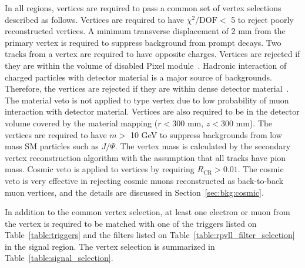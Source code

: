 In all regions, vertices are required to pass a common set of vertex selections described as follows. Vertices are required to have $\chi^2 / \mathrm{ DOF} <$ 5 to reject poorly reconstructed vertices. A minimum transverse displacement of 2 mm from the primary vertex is required to suppress background from prompt decays. Two tracks from a vertex are required to have opposite charges. Vertices are rejected if they are within the volume of disabled Pixel module~\cite{Backhaus:2110260}. Hadronic interaction of charged particles with detector material is a major source of backgrounds. Therefore, the vertices are rejected if they are within dense detector material~\cite{Aaboud:2016poq}. The material veto is not applied to \mumu type vertex due to low probability of muon interaction with detector material. Vertices are also required to be in the detector volume covered by the material mapping ($r < 300$ \si{mm}, $z < 300$ \si{mm}). The vertices are required to have $m >$ 10 GeV to suppress backgrounds from low mass SM particles such as $J/\Psi$. The vertex mass is calculated by the secondary vertex reconstruction algorithm with the assumption that all tracks have pion mass. Cosmic veto is applied to vertices by requiring $R_{\mathrm{CR}} > 0.01$. The cosmic veto is very effective in rejecting cosmic muons reconstructed as back-to-back muon vertices, and the details are discussed in Section~\ref{sec:bkg:cosmic}.

In addition to the common vertex selection, at least one electron or muon from the vertex is required to be matched with one of the triggers listed on Table~\ref{table:triggers} and the filters listed on Table~\ref{table:rpvll_filter_selection} in the signal region. The vertex selection is summarized in Table~\ref{table:signal_selection}.

